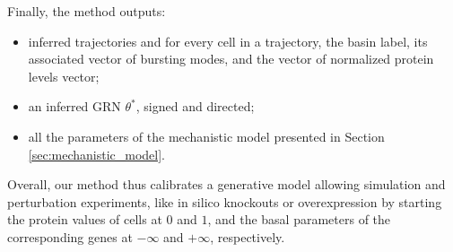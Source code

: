 Finally, the method outputs:

\begin{itemize}
\item inferred trajectories and for every cell in a trajectory, the basin label, its associated vector of bursting modes, and the vector of normalized protein levels vector; 
\item an inferred GRN $\theta^*$, signed and directed;
\item all the parameters of the mechanistic model presented in Section \ref{sec:mechanistic_model}.
\end{itemize}

Overall, our method thus calibrates a generative model allowing simulation and perturbation
experiments, like in silico knockouts or overexpression by starting the protein values of cells at $0$ and $1$, and the basal parameters of the corresponding genes at $-\infty$ and $+\infty$, respectively.